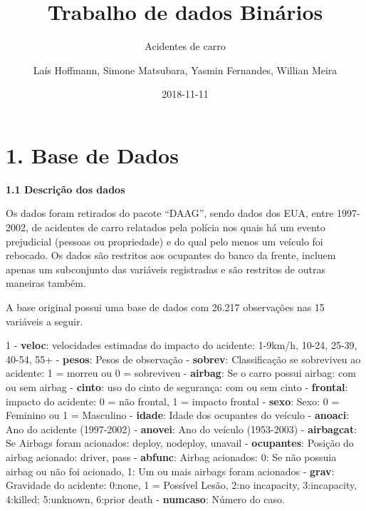\documentclass[]{article}
\title{Trabalho de dados Binários}
\subtitle{Acidentes de carro}
\author{Laís Hoffmann, Simone Matsubara, Yasmin Fernandes, Willian Meira}
\date{2018-11-11}
\begin{document}
\maketitle

\section{1. Base de Dados}\label{base-de-dados}

\textbf{1.1 Descrição dos dados}

Os dados foram retirados do pacote ``DAAG'', sendo dados dos EUA, entre
1997-2002, de acidentes de carro relatados pela polícia nos quais há um
evento prejudicial (pessoas ou propriedade) e do qual pelo menos um
veículo foi rebocado. Os dados são restritos aos ocupantes do banco da
frente, incluem apenas um subconjunto das variáveis registradas e são
restritos de outras maneiras também.

A base original possui uma base de dados com 26.217 observações nas 15
variáveis a seguir.

1 - \textbf{veloc}: velocidades estimadas do impacto do acidente:
1-9km/h, 10-24, 25-39, 40-54, 55+  - \textbf{pesos}: Pesos de
observação  - \textbf{sobrev}: Classificação se sobreviveu ao
acidente: 1 = morreu ou 0 = sobreviveu  - \textbf{airbag}: Se
o carro possui airbag: com ou sem airbag  - \textbf{cinto}:
uso do cinto de segurança: com ou sem cinto  -
\textbf{frontal}: impacto do acidente: 0 = não frontal, 1 = impacto
frontal  - \textbf{sexo}: Sexo: 0 = Feminino ou 1 = Masculino
 - \textbf{idade}: Idade dos ocupantes do veículo  -
\textbf{anoaci}: Ano do acidente (1997-2002)  -
\textbf{anovei}: Ano do veículo (1953-2003)  -
\textbf{airbagcat}: Se Airbags foram acionados: deploy, nodeploy,
unavail  - \textbf{ocupantes}: Posição do airbag acionado:
driver, pass  - \textbf{abfunc}: Airbag acionados: 0: Se não
possuia airbag ou não foi acionado, 1: Um ou mais airbags foram
acionados  - \textbf{grav}: Gravidade do acidente: 0:none, 1
= Possível Lesão, 2:no incapacity, 3:incapacity, 4:killed; 5:unknown,
6:prior death  - \textbf{numcaso}: Número do caso.
\end{document}
